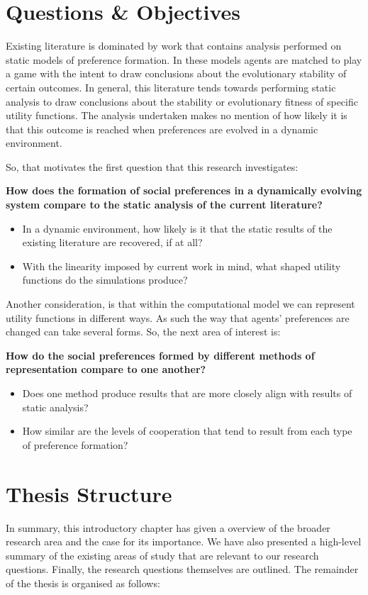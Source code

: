 \documentclass[11pt]{book}
\newcommand*{\np}{\par\noindent\newline}
\begin{document}
\section{Questions \& Objectives}\label{questions}
Existing literature is dominated by work that contains analysis performed on static models of preference formation.
In these models agents are matched to play a game with the intent to draw conclusions about the evolutionary stability of certain outcomes.
In general, this literature tends towards performing static analysis to draw conclusions about the stability or evolutionary fitness of specific utility functions.
The analysis undertaken makes no mention of how likely it is that this outcome is reached when preferences are evolved in a dynamic environment.

\np So, that motivates the first question that this research investigates:
\np\textbf{How does the formation of social preferences in a dynamically evolving system compare to the static analysis of the current literature?}
\begin{itemize}
\item In a dynamic environment, how likely is it that the static results of the existing literature are recovered, if at all? 
\item With the linearity imposed by current work in mind, what shaped utility functions do the simulations produce?
\end{itemize}
Another consideration, is that within the computational model we can represent utility functions in different ways.
As such the way that agents' preferences are changed can take several forms.
So, the next area of interest is:
\np\textbf{How do the social preferences formed by different methods of representation compare to one another?}
\begin{itemize}
\item Does one method produce results that are more closely align with results of static analysis?	
\item How similar are the levels of cooperation that tend to result from each type of preference formation?
\end{itemize}

\section{Thesis Structure}
In summary, this introductory chapter has given a overview of the broader research area and the case for its importance.
We have also presented a high-level summary of the existing areas of study that are relevant to our research questions.
Finally, the research questions themselves are outlined.
The remainder of the thesis is organised as follows:
\end{document}
